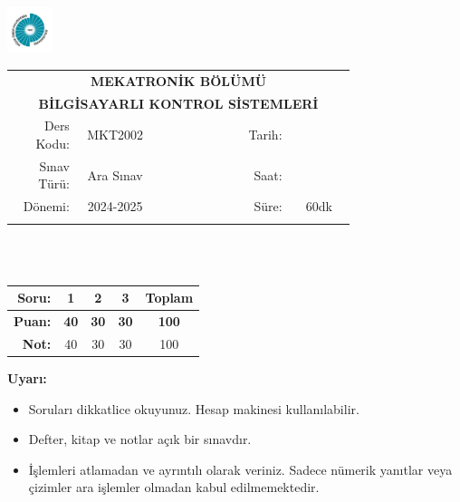 \newcommand\UniversiteAdi{Niğde Ömer Halisdemir Üniversitesi}
\newcommand\BolumAdi{MEKATRONİK BÖLÜMÜ}
\newcommand\DersKodu{MKT2002}
\newcommand\DersAdi{BİLGİSAYARLI KONTROL SİSTEMLERİ}
\newcommand\SinavAdi{Ara Sınav}
\newcommand\SinavTarihi{ }
\newcommand\SinavSaati{ }
\newcommand\SinavSuresi{60dk}

\pagestyle{fancy}
\fancyhf{} %
\noindent \includegraphics[width=0.1\textwidth]{logo}
\begin{tabular}{
    p{0.15\linewidth}
    p{0.15\linewidth}
    p{0.2\linewidth}
    p{0.1\linewidth}
    p{0.15\linewidth}}
    \multicolumn{5}{c}{\textbf{\BolumAdi}}\\
    \multicolumn{5}{c}{\textbf{\DersAdi}}\\\hline
    \multicolumn{1}{|r|}{Ders Kodu:}&
    \multicolumn{1}{|c|}{\DersKodu}&
    \multicolumn{1}{|c|}{}& 
    \multicolumn{1}{|r|}{Tarih:}&
    \multicolumn{1}{|c|}{\SinavTarihi} \\\hline
    \multicolumn{1}{|r|}{Sınav Türü:}&
    \multicolumn{1}{|c|}{\SinavAdi}&  
    \multicolumn{1}{|c|}{}&
    \multicolumn{1}{|r|}{Saat:}&
    \multicolumn{1}{|c|}{\SinavSaati}\\\hline
    \multicolumn{1}{|r|}{Dönemi:}&
    \multicolumn{1}{|c|}{2024-2025}&
    \multicolumn{1}{|c|}{}&
    \multicolumn{1}{|r|}{Süre:}&
    \multicolumn{1}{|c|}{\SinavSuresi} \\\hline
    &&&&\\
\end{tabular}\\\\
\noindent\begin{center}
\begin{tabular}{|r|c|c|c|c|}\hline
    \textbf{Soru:}&
    \textbf{1}&
    \textbf{2}&
    \textbf{3}&
    \textbf{Toplam}\\\hline
    \textbf{Puan:}&
    \textbf{40}&
    \textbf{30}&
    \textbf{30}&
    \textbf{100}\\\hline
    \textbf{Not:}&40&30&30&100\\\hline
\end{tabular}\end{center}
\noindent\textbf{Uyarı:}
\begin{itemize}\bfseries
    \item Soruları dikkatlice okuyunuz. Hesap makinesi kullanılabilir.
    \item Defter, kitap ve notlar açık bir sınavdır.
    \item İşlemleri atlamadan ve ayrıntılı olarak veriniz. Sadece nümerik yanıtlar veya çizimler ara işlemler olmadan kabul edilmemektedir.
\end{itemize}

